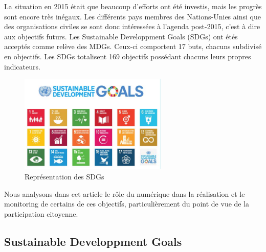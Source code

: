 \documentclass[10pt, conference, compsocconf]{llncs}
\begin{document}
	La situation en 2015 était que beaucoup d'efforts ont été investis, mais les progrès sont encore très inégaux. Les différents pays membres des Nations-Unies ainsi que des organisations civiles se sont donc intéressées à l'agenda post-2015, c'est à dire aux objectifs futurs. Les Sustainable Developpment Goals (SDGs) ont étés acceptés comme relève des MDGs. Ceux-ci comportent 17 buts, chacuns subdivisé en objectifs. Les SDGs totalisent 169 objectifs possédant chacuns leurs propres indicateurs.
	\begin{figure}
		\begin{center}
			\includegraphics[width=200pt]{sdgs.jpg}
		\end{center}
		\caption{Représentation des SDGs}
	\end{figure}
	
	Nous analysons dans cet article le rôle du numérique dans la réalisation et le monitoring de certains de ces objectifs, particulièrement du point de vue de la participation citoyenne.

\subsection{Sustainable Developpment Goals}
\end{document}
